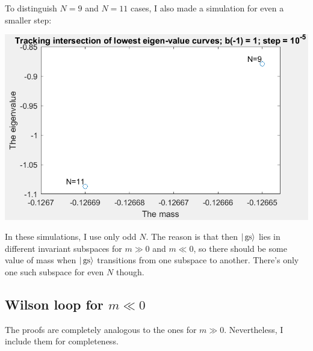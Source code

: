 To distinguish $N= 9$ and $N=11$ cases, I also made a simulation for even a smaller step:
\begin{center}
\includegraphics[scale=0.8]{track2.jpg}
\end{center}

In these simulations, I use only odd $N$. The reason is that then $|\operatorname{gs}\rangle$ lies in different invariant subspaces for $m \gg 0$ and $m \ll 0$, so there should be some value of mass when $|\operatorname{gs}\rangle$ transitions from one subspace to another. There's only one such subspace for even $N$ though.

\subsection{Wilson loop for $m \ll 0$}
The proofs are completely analogous to the ones for $m \gg 0$. Nevertheless, I include them for completeness.
